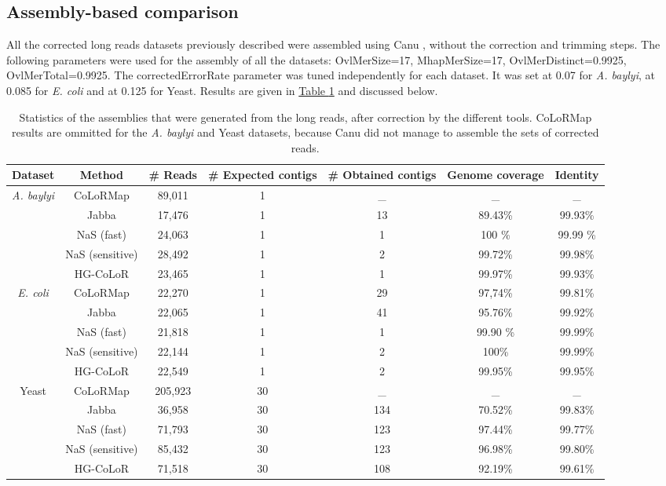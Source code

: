 \documentclass[long, final]{jobim2017}
\begin{document}
\subsection{Assembly-based comparison}
	
All the corrected long reads datasets previously described were assembled using Canu \cite{Koren2016}, without the correction and trimming steps. The following parameters were used for the assembly of all the datasets: OvlMerSize=17, MhapMerSize=17, OvlMerDistinct=0.9925, OvlMerTotal=0.9925. The correctedErrorRate parameter was tuned independently for each dataset. It was set at 0.07 for \emph{A. baylyi}, at 0.085 for \emph{E. coli} and at 0.125 for Yeast. Results are given in \hyperref[tabas]{Table \ref*{tabas}} and discussed below.

\begin{table}[ht]
	\begin{center}
	\begin{tabular}{|c|c|c|c|c|c|c|}
		\hline
		\textbf{Dataset} & \textbf{Method} & \textbf{\# Reads} & \textbf{\# Expected contigs} & \textbf{\# Obtained contigs} & \textbf{Genome coverage} 
		& \textbf{Identity} \\
		\hline
		\multirow{5}{*}{\emph{A. baylyi}} & CoLoRMap & 89,011 & 1 & \_ & \_ & \_ \\
		& Jabba & 17,476 & 1 & 13 & 89.43\% & 99.93\% \\
		& NaS (fast) & 24,063 & 1 & 1 & 100 \% & 99.99 \% \\
		& NaS (sensitive) & 28,492 & 1 & 2 & 99.72\% & 99.98\% \\
		& HG-CoLoR & 23,465 & 1 & 1 & 99.97\% & 99.93\% \\
		\hline
		\multirow{5}{*}{\emph{E. coli}} & CoLoRMap & 22,270 & 1 & 29 & 97,74\% & 99.81\% \\
		& Jabba & 22,065 & 1 & 41 & 95.76\% & 99.92\% \\
		& NaS (fast) & 21,818 & 1 & 1 & 99.90 \% & 99.99\% \\
		& NaS (sensitive) & 22,144 & 1 & 2 & 100\% & 99.99\% \\
		& HG-CoLoR & 22,549 & 1 & 2 & 99.95\% & 99.95\% \\
		\hline
		\multirow{5}{*}{Yeast} & CoLoRMap & 205,923 & 30 & \_ & \_ & \_ \\
		& Jabba & 36,958 & 30 & 134 & 70.52\% & 99.83\% \\
		& NaS (fast) & 71,793 & 30 & 123 & 97.44\% & 99.77\% \\
		& NaS (sensitive) & 85,432 & 30 & 123 & 96.98\% & 99.80\% \\
		& HG-CoLoR & 71,518 & 30 & 108 & 92.19\% & 99.61\% \\
		\hline
	\end{tabular}
	\end{center}
	\caption{Statistics of the assemblies that were generated from the long reads, after correction by the different tools. CoLoRMap results are ommitted 
	for the \emph{A. baylyi} and Yeast datasets, because Canu did not manage to assemble the sets of corrected reads.
	\label{tabas}}
\end{table}
\end{document}
